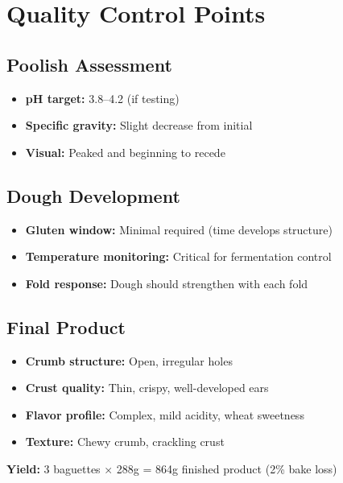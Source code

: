 \documentclass[10pt,a4paper]{article}
\begin{document}
    \section{Quality Control Points}

    \subsection{Poolish Assessment}
    \begin{itemize}[leftmargin=*]
        \item \textbf{pH target:} 3.8--4.2 (if testing)
        \item \textbf{Specific gravity:} Slight decrease from initial
        \item \textbf{Visual:} Peaked and beginning to recede
    \end{itemize}

    \subsection{Dough Development}
    \begin{itemize}[leftmargin=*]
        \item \textbf{Gluten window:} Minimal required (time develops structure)
        \item \textbf{Temperature monitoring:} Critical for fermentation control
        \item \textbf{Fold response:} Dough should strengthen with each fold
    \end{itemize}

    \subsection{Final Product}
    \begin{itemize}[leftmargin=*]
        \item \textbf{Crumb structure:} Open, irregular holes
        \item \textbf{Crust quality:} Thin, crispy, well-developed ears
        \item \textbf{Flavor profile:} Complex, mild acidity, wheat sweetness
        \item \textbf{Texture:} Chewy crumb, crackling crust
    \end{itemize}

    \vspace{1em}
    \noindent\textbf{Yield:} 3 baguettes × 288g = 864g finished product (2\% bake loss)
\end{document}
